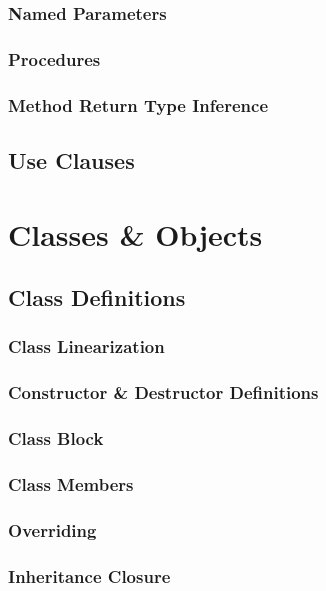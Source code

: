 \subsection{Named Parameters}

\subsection{Procedures}

\subsection{Method Return Type Inference}

\section{Use Clauses}

\chapter{Classes \& Objects}

\section{Class Definitions}

\subsection{Class Linearization}

\subsection{Constructor \& Destructor Definitions}

\subsection{Class Block}

\subsection{Class Members}

\subsection{Overriding}

\subsection{Inheritance Closure}

